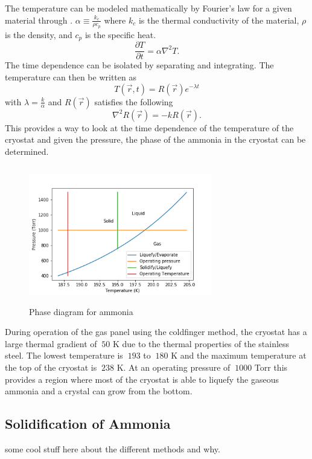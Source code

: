 \documentclass[12pt,notitlepage]{amsart}
\begin{document}
The temperature can be modeled mathematically by Fourier's law for a given material through \cite{HT}. $\alpha \equiv \frac{k_{c}}{\rho c_{p}}$ where $k_{c}$ is the thermal conductivity of the material, $\rho$ is the density, and $c_{p}$ is the specific heat. 
\begin{equation}
\frac{\partial T}{\partial t} = \alpha \nabla^{2} T.
\end{equation}
The time dependence can be isolated by separating and integrating. The temperature can then be written as 
\begin{equation}
T(\vec{r}, t) = R(\vec{r}) e^{-\lambda t}
\end{equation}
with 
$\lambda = \frac{k}{\alpha}$
and 
$R(\vec{r})$ satisfies the following 
\begin{equation}
 \nabla^{2}R(\vec{r})= -k R(\vec{r}).
\end{equation}
This provides a way to look at the time dependence of the temperature of the cryostat and given the pressure, the phase of the ammonia in the cryostat can be determined. 
\begin{figure}[h]
 \caption{Phase diagram for ammonia}
 \label{PDNH3}
 \centering
 \includegraphics[width = 8cm,height = 6cm]{NH3_PD_2} 
\end{figure}
During operation of the gas panel using the coldfinger method, the cryostat has a large thermal gradient of $~50$ K due to the thermal properties of the stainless steel. The lowest temperature is $~ 193$ to $~ 180$ K and the maximum temperature at the top of the cryostat is $~ 238$ K. At an operating pressure of $~ 1000$ Torr this provides a region where most of the cryostat is able to liquefy the gaseous ammonia and a crystal can grow from the bottom. 
  
  
  
  
  \subsection{Solidification of Ammonia} 
  some cool stuff here about the different methods and why. 
\end{document}
